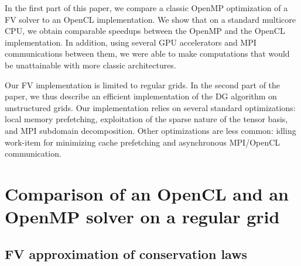 \documentclass[12pt]{amsart}
\begin{document}
In the first part of this paper, we compare a classic OpenMP optimization of a FV solver to an OpenCL implementation. We show that on a standard multicore CPU, we obtain comparable speedups between the OpenMP and the OpenCL implementation. In addition, using several GPU accelerators and MPI communications between them, we were able to make computations that would be unattainable with more classic architectures.

Our FV implementation is limited to regular grids. In the second part of the paper, we thus describe an efficient implementation of the DG algorithm on unstructured grids.  Our implementation relies on several standard optimizations: local memory prefetching, exploitation of the sparse nature of the tensor basis, and MPI subdomain decomposition. Other optimizations are less common: idling work-item for minimizing cache prefetching and asynchronous MPI/OpenCL communication.

\section{\label{fv}Comparison of an OpenCL and an OpenMP solver on a regular grid}

\subsection{FV approximation of conservation laws}
\end{document}
